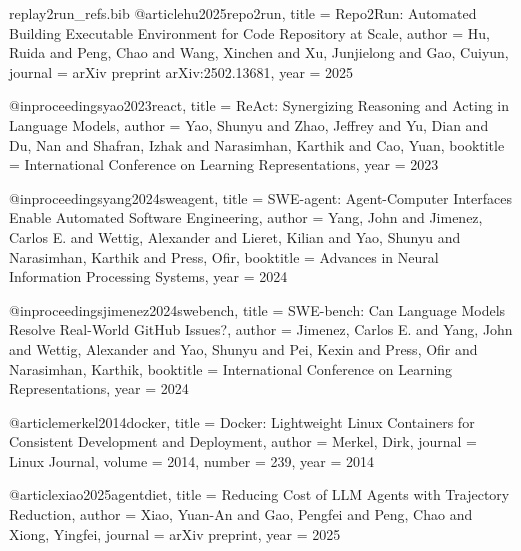 \begin{filecontents*}{replay2run_refs.bib}
@article{hu2025repo2run,
  title = {Repo2Run: Automated Building Executable Environment for Code Repository at Scale},
  author = {Hu, Ruida and Peng, Chao and Wang, Xinchen and Xu, Junjielong and Gao, Cuiyun},
  journal = {arXiv preprint arXiv:2502.13681},
  year = {2025}
}

@inproceedings{yao2023react,
  title = {ReAct: Synergizing Reasoning and Acting in Language Models},
  author = {Yao, Shunyu and Zhao, Jeffrey and Yu, Dian and Du, Nan and Shafran, Izhak and Narasimhan, Karthik and Cao, Yuan},
  booktitle = {International Conference on Learning Representations},
  year = {2023}
}

@inproceedings{yang2024sweagent,
  title = {SWE-agent: Agent-Computer Interfaces Enable Automated Software Engineering},
  author = {Yang, John and Jimenez, Carlos E. and Wettig, Alexander and Lieret, Kilian and Yao, Shunyu and Narasimhan, Karthik and Press, Ofir},
  booktitle = {Advances in Neural Information Processing Systems},
  year = {2024}
}

@inproceedings{jimenez2024swebench,
  title = {SWE-bench: Can Language Models Resolve Real-World GitHub Issues?},
  author = {Jimenez, Carlos E. and Yang, John and Wettig, Alexander and Yao, Shunyu and Pei, Kexin and Press, Ofir and Narasimhan, Karthik},
  booktitle = {International Conference on Learning Representations},
  year = {2024}
}

@article{merkel2014docker,
  title = {Docker: Lightweight Linux Containers for Consistent Development and Deployment},
  author = {Merkel, Dirk},
  journal = {Linux Journal},
  volume = {2014},
  number = {239},
  year = {2014}
}

@article{xiao2025agentdiet,
  title = {Reducing Cost of LLM Agents with Trajectory Reduction},
  author = {Xiao, Yuan-An and Gao, Pengfei and Peng, Chao and Xiong, Yingfei},
  journal = {arXiv preprint},
  year = {2025}
}
\end{filecontents*}

\documentclass[sigconf,review,anonymous]{acmart}

\usepackage{booktabs}
\usepackage{xspace}
\usepackage{listings}
\usepackage{enumitem}

\newcommand{\tool}{Replay2Run\xspace}
\newcommand{\planner}{Planning Agent\xspace}
\newcommand{\ttg}{Typed Task Graph\xspace}
\newcommand{\dgsr}{DGSR\xspace}
\newcommand{\ebsr}{EBSR\xspace}

\renewcommand\footnotetextcopyrightpermission[1]{}
\pagestyle{plain}



